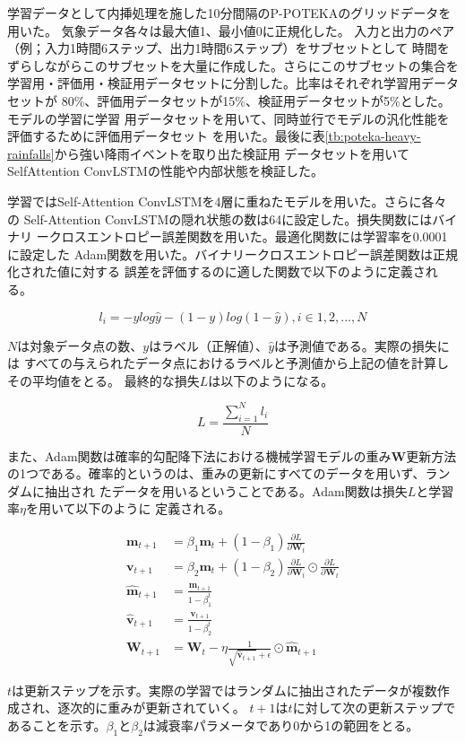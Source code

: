 学習データとして内挿処理を施した10分間隔のP-POTEKAのグリッドデータを用いた。
気象データ各々は最大値1、最小値0に正規化した。
入力と出力のペア（例；入力1時間6ステップ、出力1時間6ステップ）をサブセットとして
時間をずらしながらこのサブセットを大量に作成した。さらにこのサブセットの集合を
学習用・評価用・検証用データセットに分割した。比率はそれぞれ学習用データセットが
80\%、評価用データセットが15\%、検証用データセットが5\%とした。モデルの学習に学習
用データセットを用いて、同時並行でモデルの汎化性能を評価するために評価用データセット
を用いた。最後に表\ref{tb:poteka-heavy-rainfalls}から強い降雨イベントを取り出た検証用
データセットを用いてSelfAttention ConvLSTMの性能や内部状態を検証した。

学習ではSelf-Attention ConvLSTMを4層に重ねたモデルを用いた。さらに各々の
Self-Attention ConvLSTMの隠れ状態の数は64に設定した。損失関数にはバイナリ
ークロスエントロピー誤差関数を用いた。最適化関数には学習率を0.0001に設定した
Adam関数を用いた。バイナリークロスエントロピー誤差関数は正規化された値に対する
誤差を評価するのに適した関数で以下のように定義される。

\begin{equation}
l_{i} = -ylog\hat{y} - (1-y)log(1-\hat{y}), i \in {1, 2, ..., N}
\end{equation}

$N$は対象データ点の数、$y$はラベル（正解値）、$\hat{y}$は予測値である。実際の損失には
すべての与えられたデータ点におけるラベルと予測値から上記の値を計算しその平均値をとる。
最終的な損失$L$は以下のようになる。

\begin{equation}
L = \frac{\sum_{i=1}^Nl_{i}}{N}
\end{equation}


また、Adam関数は確率的勾配降下法における機械学習モデルの重み$\boldsymbol{W}$更新方法
の1つである。確率的というのは、重みの更新にすべてのデータを用いず、ランダムに抽出され
たデータを用いるということである。Adam関数は損失$L$と学習率$\eta$を用いて以下のように
定義される。

\begin{align}
\boldsymbol{m}_{t+1} &= \beta_{1}\boldsymbol{m}_{t} + (1 - \beta_{1})\frac{\partial L}{\partial \boldsymbol{W}_{t}} \\
\boldsymbol{v}_{t+1} &= \beta_{2}\boldsymbol{m}_{t} + (1 - \beta_{2})\frac{\partial L}{\partial \boldsymbol{W}_{t}} \odot \frac{\partial L}{\partial \boldsymbol{W}_{t}} \\
\boldsymbol{\hat{m}}_{t+1} &= \frac{\boldsymbol{m}_{t+1}}{1 - \beta_{1}^t} \\
\boldsymbol{\hat{v}}_{t+1} &= \frac{\boldsymbol{v}_{t+1}}{1 - \beta_{2}^t} \\
\boldsymbol{W}_{t+1} &= \boldsymbol{W}_{t} - \eta\frac{1}{\sqrt{\boldsymbol{\hat{v}}_{t+1}} + \epsilon} \odot \boldsymbol{\hat{m}}_{t+1}
\end{align}

$t$は更新ステップを示す。実際の学習ではランダムに抽出されたデータが複数作成され、逐次的に重みが更新されていく。
$t+1$は$t$に対して次の更新ステップであることを示す。$\beta_{1}$と$\beta_{2}$は減衰率パラメータであり0から1の範囲をとる。

